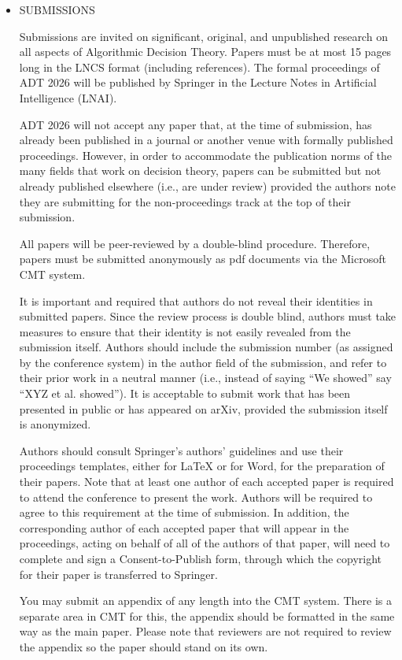 \documentclass[prodmode,acmtecs]{acmsmall} %
\begin{document}
\begin{itemize}\item  SUBMISSIONS 
 
  Submissions are invited on significant, original, and unpublished research on all aspects of Algorithmic Decision Theory. Papers must be at most 15 pages long in the LNCS format (including references). The formal proceedings of ADT 2026 will be published by Springer in the Lecture Notes in Artificial Intelligence (LNAI).  
 
  ADT 2026 will not accept any paper that, at the time of submission, has already been published in a journal or another venue with formally published proceedings. However, in order to accommodate the publication norms of the many fields that work on decision theory, papers can be submitted but not already published elsewhere (i.e., are under review) provided the authors note they are submitting for the non-proceedings track at the top of their submission.  
 
  All papers will be peer-reviewed by a double-blind procedure. Therefore, papers must be submitted anonymously as pdf documents via the Microsoft CMT system.  
 
  It is important and required that authors do not reveal their identities in submitted papers. Since the review process is double blind, authors must take measures to ensure that their identity is not easily revealed from the submission itself. Authors should include the submission number (as assigned by the conference system) in the author field of the submission, and refer to their prior work in a neutral manner (i.e., instead of saying “We showed” say “XYZ et al. showed”). It is acceptable to submit work that has been presented in public or has appeared on arXiv, provided the submission itself is anonymized.  
 
  Authors should consult Springer’s authors’ guidelines and use their proceedings templates, either for LaTeX or for Word, for the preparation of their papers. Note that at least one author of each accepted paper is required to attend the conference to present the work. Authors will be required to agree to this requirement at the time of submission. In addition, the corresponding author of each accepted paper that will appear in the proceedings, acting on behalf of all of the authors of that paper, will need to complete and sign a Consent-to-Publish form, through which the copyright for their paper is transferred to Springer.  
 
  You may submit an appendix of any length into the CMT system. There is a separate area in CMT for this, the appendix should be formatted in the same way as the main paper. Please note that reviewers are not required to review the appendix so the paper should stand on its own.  
 

\end{itemize}
\end{document}
